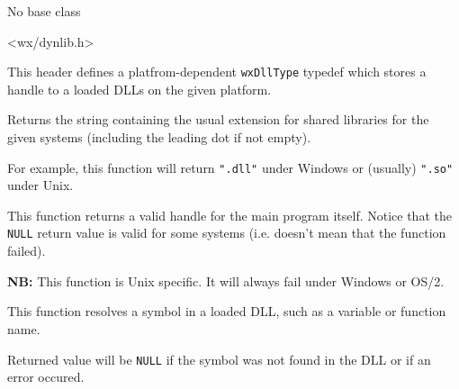 
No base class


<wx/dynlib.h>


This header defines a platfrom-dependent {\tt wxDllType} typedef which stores
a handle to a loaded DLLs on the given platform.


\label{wxdllloadergetdllext}


Returns the string containing the usual extension for shared libraries for the
given systems (including the leading dot if not empty).

For example, this function will return {\tt ".dll"} under Windows or (usually) 
{\tt ".so"} under Unix.

\label{wxdllloadergetprogramhandle}


This function returns a valid handle for the main program itself. Notice that
the {\tt NULL} return value is valid for some systems (i.e. doesn't mean that
the function failed).

{\bf NB:} This function is Unix specific. It will always fail under Windows
or OS/2.

\label{wxdllloadergetsymbol}


This function resolves a symbol in a loaded DLL, such as a variable or
function name.

Returned value will be {\tt NULL} if the symbol was not found in the DLL or if
an error occured.




\label{wxdllloaderloadlibrary}


